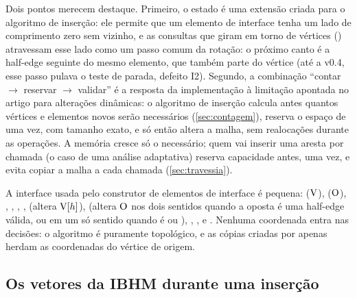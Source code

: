 Dois pontos merecem destaque. Primeiro, o estado \COLLAPSED{} é uma extensão criada para o algoritmo de inserção:
ele permite que um elemento de interface tenha um lado de comprimento zero sem vizinho, e as consultas que giram em torno
de vértices () atravessam esse lado como um passo comum da rotação: o próximo canto é a half-edge seguinte
do mesmo elemento, que também parte do vértice (até a v0.4, esse passo pulava o teste de parada, defeito I2). Segundo, a combinação ``contar $\to$ reservar $\to$ validar'' é a
resposta da implementação à limitação apontada no artigo para alterações dinâmicas: o algoritmo de inserção calcula
antes quantos vértices e elementos novos serão necessários (\cref{sec:contagem}), reserva o espaço de uma vez, com tamanho exato, e só
então altera a malha, sem realocações durante as operações. A memória cresce só o necessário; quem vai inserir uma
aresta por chamada (o caso de uma análise adaptativa) reserva capacidade antes, uma vez, e evita copiar a malha a cada
chamada (\cref{sec:travessia}).

A interface usada pelo construtor de elementos de interface é pequena:  ($\mathrm{V}$), 
($\mathrm{O}$), , , , ,  (altera $\mathrm{V}[h]$),
 (altera $\mathrm{O}$ nos dois sentidos quando a oposta é uma half-edge válida, ou em um só sentido quando é
\BORDER{} ou \COLLAPSED), , ,  e
. Nenhuma coordenada entra nas decisões: o algoritmo é puramente topológico, e as cópias criadas por
 apenas herdam as coordenadas do vértice de origem.

\subsection{Os vetores da IBHM durante uma inserção}
\label{sec:ibhm-insercao}

